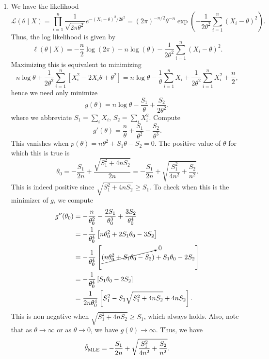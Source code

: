 \documentclass[11pt]{article}
\begin{document}
\begin{enumerate}
        \begin{enumerate}
            \item We have the likelihood \[
                \mathcal{L}(\theta\mid X)
                    = \prod_{i = 1}^n \frac{1}{\sqrt{2\pi\theta^2}} e^{-(X_i - \theta)^2 / 2\theta^2}
                    = (2\pi)^{-n / 2} \theta^{-n} \exp\left(-\frac{1}{2\theta^2}
                    \sum_{i = 1}^n (X_i - \theta)^2\right).
            \] Thus, the log likelihood is given by \[
                \ell(\theta\mid X)
                    = -\frac{n}{2}\log(2\pi) - n\log(\theta) -
                    \frac{1}{2\theta^2}\sum_{i = 1}^n (X_i - \theta)^2.
            \] Maximizing this is equivalent to minimizing \[
                n\log{\theta} + \frac{1}{2\theta^2}\sum_{i = 1}^n \left[X_i^2 - 2X_i\theta + \theta^2\right]
                    = n\log{\theta} - \frac{1}{\theta}\sum_{i = 1}^n X_i + \frac{1}{2\theta^2}\sum_{i = 1}^n X_i^2 + \frac{n}{2},
            \] hence we need only minimize \[
                g(\theta)
                    = n\log{\theta} - \frac{S_1}{\theta} + \frac{S_2}{2\theta^2},
            \] where we abbreviate $S_1 = \sum_i X_i$, $S_2 = \sum_i X_i^2$.
            Compute \[
                g'(\theta) = \frac{n}{\theta} + \frac{S_1}{\theta^2} - \frac{S_2}{\theta^3}.
            \] This vanishes when $p(\theta) = n\theta^2 + S_1\theta - S_2 = 0$.
            The positive value of $\theta$ for which this is true is \[
                \theta_0
                    = -\frac{S_1}{2n} + \frac{\sqrt{S_1^2 + 4nS_2}}{2n}
                    = -\frac{S_1}{2n} + \sqrt{\frac{S_1^2}{4n^2} + \frac{S_2}{n^2}}.
            \] This is indeed positive since $\sqrt{S_1^2 + 4nS_2} \geq S_1$.
            To check when this is the minimizer of $g$, we compute \begin{align*}
                g''(\theta_0)
                    &= -\frac{n}{\theta_0^2} - \frac{2S_1}{\theta_0^3} + \frac{3S_2}{\theta_0^4} \\
                    &= -\frac{1}{\theta_0^4}\left[n\theta_0^2 + 2S_1\theta_0 - 3S_2\right] \\
                    &= -\frac{1}{\theta_0^4}\left[\cancelto{0}{(n\theta_0^2 + S_1\theta_0 - S_2)} + S_1\theta_0 - 2S_2\right] \\
                    &= -\frac{1}{\theta_0^4}\left[S_1\theta_0 - 2S_2\right] \\
                    &= \frac{1}{2n\theta_0^4}\left[S_1^2 - S_1\sqrt{S_1^2 + 4nS_2} + 4nS_2\right].
            \end{align*}
            This is non-negative when $\sqrt{S_1^2 + 4nS_2} \geq S_1$, which
            always holds.
            Also, note that as $\theta \to \infty$ or as $\theta \to 0$, we
            have $g(\theta) \to \infty$.
            Thus, we have \[
                \hat{\theta}_{\text{MLE}}
                    = -\frac{S_1}{2n} + \sqrt{\frac{S_1^2}{4n^2} + \frac{S_2}{n^2}}.
            \]



\end{enumerate}
\end{enumerate}
\end{document}
